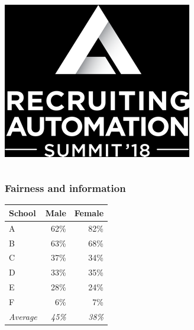 \begin{frame}
\begin{columns}
\begin{column}{0.5\textwidth}
      \\
      \includegraphics[width=\columnwidth]{../figures/recruitement-automation}
    \end{column}
  \end{columns}
\end{frame}

\begin{frame}
  \frametitle{Fairness and information}
  \begin{example}
    \begin{table}[H]
      \begin{tabular}{l|r|r}
        School & Male  & Female\\
        \hline
        A & 62\% & 82\%\\
        B & 63\% & 68\%\\
        C & 37\% & 34\%\\
        D & 33\% & 35\%\\
        E & 28\% & 24\%\\
        F &  6\% &  7\%\\
        \hline
        \emph{Average} & \emph{45\%} & \emph{38\%}
      \end{tabular}
    \end{table}
  \end{example}
\end{frame}


